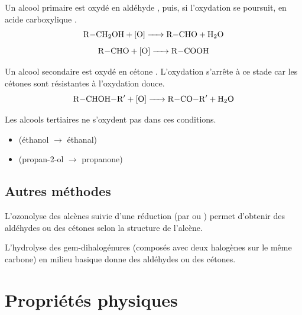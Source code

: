 \begin{propriete}
Un alcool primaire  est oxydé en aldéhyde , puis, si l'oxydation se poursuit, en acide carboxylique .
\[
\ce{R-CH2OH + [O] -> R-CHO + H2O}
\]
\[
\ce{R-CHO + [O] -> R-COOH}
\]
\end{propriete}

\begin{propriete}
Un alcool secondaire  est oxydé en cétone . L'oxydation s'arrête à ce stade car les cétones sont résistantes à l'oxydation douce.
\[
\ce{R-CHOH-R$'$ + [O] -> R-CO-R$'$ + H2O}
\]
\end{propriete}

\begin{remarque}
Les alcools tertiaires ne s'oxydent pas dans ces conditions.
\end{remarque}

\begin{exemple}
\begin{itemize}
    \item {} (éthanol $\rightarrow$ éthanal)
    \item {} (propan-2-ol $\rightarrow$ propanone)
\end{itemize}
\end{exemple}

\subsection{Autres méthodes}

\begin{propriete}
L'ozonolyse des alcènes suivie d'une réduction (par  ou ) permet d'obtenir des aldéhydes ou des cétones selon la structure de l'alcène.
\end{propriete}

\begin{propriete}
L'hydrolyse des gem-dihalogénures (composés avec deux halogènes sur le même carbone) en milieu basique donne des aldéhydes ou des cétones.
\end{propriete}

\section{Propriétés physiques}

